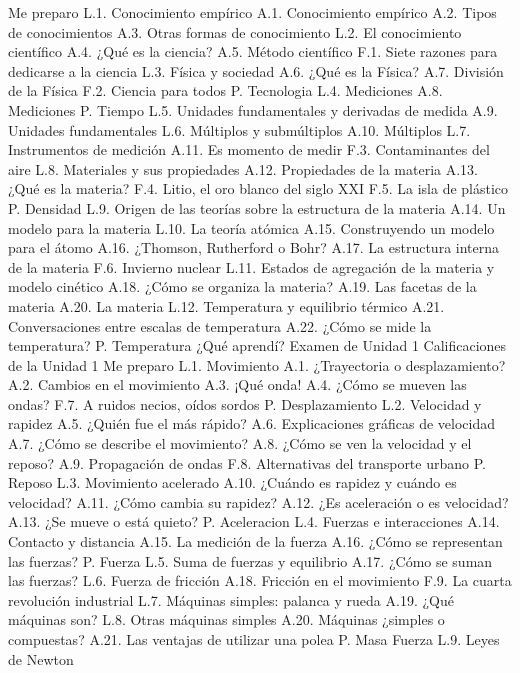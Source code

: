 Me preparo
L.1.  Conocimiento empírico
A.1.  Conocimiento empírico
A.2.  Tipos de conocimientos
A.3.  Otras formas de conocimiento
L.2.  El conocimiento científico
A.4.  ¿Qué es la ciencia?
A.5.  Método científico
F.1.  Siete razones para dedicarse a la ciencia
L.3.  Física y sociedad
A.6.  ¿Qué es la Física?
A.7.  División de la Física
F.2.  Ciencia para todos
P.    Tecnologia
L.4.  Mediciones
A.8.  Mediciones
P.    Tiempo
L.5.  Unidades fundamentales y derivadas de medida
A.9.  Unidades fundamentales
L.6.  Múltiplos y submúltiplos
A.10. Múltiplos
L.7.  Instrumentos de medición
A.11. Es momento de medir
F.3.  Contaminantes del aire
L.8.  Materiales y sus propiedades
A.12. Propiedades de la materia
A.13. ¿Qué es la materia?
F.4.  Litio, el oro blanco del siglo XXI
F.5.  La isla de plástico
P.    Densidad
L.9.  Origen de las teorías sobre la estructura de la materia
A.14. Un modelo para la materia
L.10. La teoría atómica
A.15. Construyendo un modelo para el átomo
A.16. ¿Thomson, Rutherford o Bohr?
A.17. La estructura interna de la materia
F.6.  Invierno nuclear
L.11. Estados de agregación de la materia y modelo cinético
A.18. ¿Cómo se organiza la materia?
A.19. Las facetas de la materia
A.20. La materia
L.12. Temperatura y equilibrio térmico
A.21. Conversaciones entre escalas de temperatura
A.22. ¿Cómo se mide la temperatura?
P.    Temperatura
¿Qué aprendí?
Examen de Unidad 1
Calificaciones de la Unidad 1
Me preparo
L.1.  Movimiento
A.1.  ¿Trayectoria o desplazamiento?
A.2.  Cambios en el movimiento
A.3.  ¡Qué onda!
A.4.  ¿Cómo se mueven las ondas?
F.7.  A ruidos necios, oídos sordos
P.    Desplazamiento
L.2.  Velocidad y rapidez
A.5.  ¿Quién fue el más rápido?
A.6.  Explicaciones gráficas de velocidad
A.7.  ¿Cómo se describe el movimiento?
A.8.  ¿Cómo se ven la velocidad y el reposo?
A.9.  Propagación de ondas
F.8.  Alternativas del transporte urbano
P.    Reposo
L.3.  Movimiento acelerado
A.10. ¿Cuándo es rapidez y cuándo es velocidad?
A.11. ¿Cómo cambia su rapidez?
A.12. ¿Es aceleración o es velocidad?
A.13. ¿Se mueve o está quieto?
P.    Aceleracion
L.4.  Fuerzas e interacciones
A.14. Contacto y distancia
A.15. La medición de la fuerza
A.16. ¿Cómo se representan las fuerzas?
P.    Fuerza
L.5.  Suma de fuerzas y equilibrio
A.17. ¿Cómo se suman las fuerzas?
L.6.  Fuerza de fricción
A.18. Fricción en el movimiento
F.9.  La cuarta revolución industrial
L.7.  Máquinas simples: palanca y rueda
A.19. ¿Qué máquinas son?
L.8.  Otras máquinas simples
A.20. Máquinas ¿simples o compuestas?
A.21. Las ventajas de utilizar una polea
P.    Masa Fuerza
L.9.  Leyes de Newton

